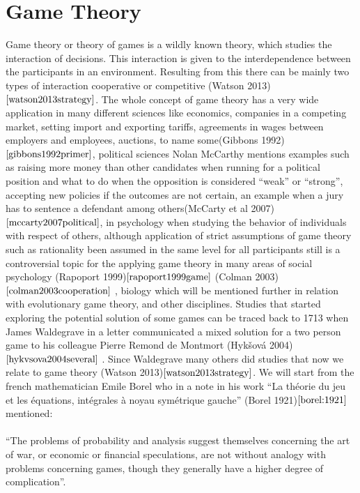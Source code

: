\documentclass{article}
\begin{document}
\section{Game Theory}\label{first_section}
Game theory or theory of games is a wildly known theory, which studies the interaction of decisions. This interaction is given to the interdependence between the participants in an environment. Resulting from this there can be mainly two types of interaction cooperative or competitive (Watson 2013)$\cite{watson2013strategy}$. The whole concept of game theory has a very wide application in many different sciences like economics, companies in a competing market, setting import and exporting tariffs, agreements in wages between employers and employees, auctions, to name some(Gibbons 1992)$\cite{gibbons1992primer}$, political sciences Nolan McCarthy mentions examples such as raising more money than other candidates when running for a political position and what to do when the opposition is considered “weak” or “strong”, accepting new policies if the outcomes are not certain,  an example when a jury has to sentence a defendant among others(McCarty et al 2007)$\cite{mccarty2007political}$, in psychology when studying the behavior of individuals with respect of others, although application of strict assumptions of game theory such as rationality been assumed in the same level for all participants still is a controversial topic for the applying game theory in many areas of social psychology (Rapoport 1999)$\cite{rapoport1999game}$ (Colman 2003)$\cite{colman2003cooperation}$ , biology which will be mentioned further in relation with evolutionary game theory, and other disciplines. Studies that started exploring the potential solution of some games can be traced back to 1713  when James Waldegrave in a letter communicated a mixed solution for a two person game to his colleague Pierre Remond de Montmort (Hykšová 2004)$\cite{hykvsova2004several}$ . Since Waldegrave many others did studies that now we relate to game theory (Watson 2013)$\cite{watson2013strategy}$.  We will start from the french mathematician Emile Borel who in a note in his work ``La th\'{e}orie du jeu et les \'{e}quations, int\'{e}grales \`{a} noyau sym\'{e}trique gauche'' (Borel 1921)$\cite{borel:1921}$ mentioned:
\\\\ ``The problems of probability and analysis suggest themselves concerning the art of war, or economic or financial speculations, are not without analogy with problems concerning games, though they generally have a higher degree of complication''.
\end{document}
